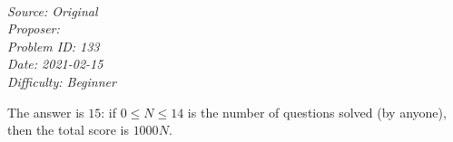 \SSbreak\\
\emph{Source: Original}\\
\emph{Proposer: \Ptroll}\\ %
\emph{Problem ID: 133}\\
\emph{Date: 2021-02-15}\\
\emph{Difficulty: Beginner}\\
\SSbreak

\bigskip

\begin{solution}\hfil\medskip
	
    The answer is $\boxed{15}$: if $0 \le N \le 14$ is the number of questions solved (by anyone), then the total score is $1000N$.
\end{solution}\bigskip
